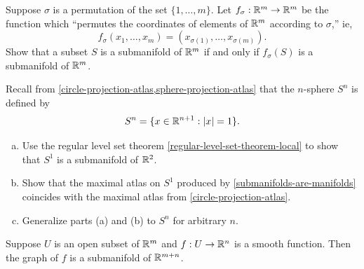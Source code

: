 \begin{exercise} \label{permutation-submanifold}
	Suppose $\sigma$ is a permutation of the set $\{1, \dotsc, m\}$. Let $f_\sigma : \mathbb{R}^m \to \mathbb{R}^m$ be the function which ``permutes the coordinates of elements of $\mathbb{R}^m$ according to $\sigma$,'' ie, 
	\[ f_\sigma(x_1, \dotsc, x_m) = (x_{\sigma(1)}, \dotsc, x_{\sigma(m)}). \]
	Show that a subset $S$ is a submanifold of $\mathbb{R}^m$ if and only if $f_\sigma(S)$ is a submanifold of $\mathbb{R}^m$. 
\end{exercise}

\begin{exercise}
	Recall from \cref{circle-projection-atlas,sphere-projection-atlas} that the $n$-sphere $S^n$ is defined by
	\[ S^n = \{ x \in \mathbb{R}^{n+1} : |x| = 1 \}. \]
	\begin{enumerate}[(a)]
		\item Use the regular level set theorem \ref{regular-level-set-theorem-local} to show that $S^1$ is a submanifold of $\mathbb{R}^{2}$. 
		\item Show that the maximal atlas on $S^1$ produced by \cref{submanifolds-are-manifolds} coincides with the maximal atlas from \cref{circle-projection-atlas}. 
		\item Generalize parts (a) and (b) to $S^n$ for arbitrary $n$. 
	\end{enumerate}
\end{exercise}

\begin{proposition} \label{graphs-smooth}
	Suppose $U$ is an open subset of $\mathbb{R}^m$ and $f : U \to \mathbb{R}^n$ is a smooth function. Then the graph of $f$ is a submanifold of $\mathbb{R}^{m+n}$. 
\end{proposition}

